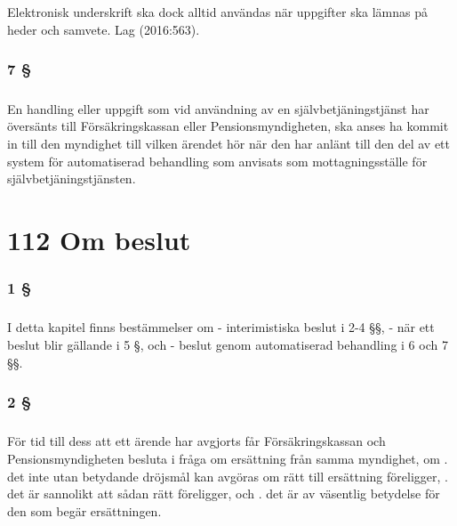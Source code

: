 \documentclass[a4paper,notitlepage,openany,10pt]{book}
\begin{document}
\paragraph*{}
Elektronisk underskrift ska dock alltid användas när uppgifter ska lämnas på heder och samvete.
Lag (2016:563).
\subsection*{7 §}
\paragraph*{}
En handling eller uppgift som vid användning av en självbetjäningstjänst har översänts till Försäkringskassan eller Pensionsmyndigheten, ska anses ha kommit in till den myndighet till vilken ärendet hör när den har anlänt till den del av ett system för automatiserad behandling som anvisats som mottagningsställe för självbetjäningstjänsten.
\chapter*{112 Om beslut}
\subsection*{1 §}
\paragraph*{}
I detta kapitel finns bestämmelser om
\newline - interimistiska beslut i 2-4 §§,
\newline - när ett beslut blir gällande i 5 §, och
\newline - beslut genom automatiserad behandling i 6 och 7 §§.
\subsection*{2 §}
\paragraph*{}
För tid till dess att ett ärende har avgjorts får Försäkringskassan och Pensionsmyndigheten besluta i fråga om ersättning från samma myndighet, om
. det inte utan betydande dröjsmål kan avgöras om rätt till ersättning föreligger,
. det är sannolikt att sådan rätt föreligger, och
. det är av väsentlig betydelse för den som begär ersättningen.
\end{document}
